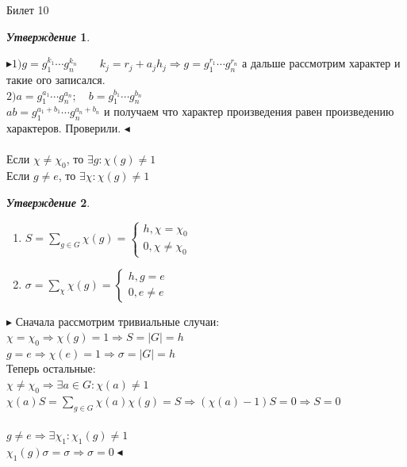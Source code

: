 \documentclass[a4paper,12pt]{article}
\newtheorem{utv}{\textit{Утверждение}}
\newcommand{\q}{\quad}
\newcommand{\pb}{\blacktriangleright}
\newcommand{\pe}{\blacktriangleleft}
\newcommand{\Ra}{\Rightarrow}
\newcommand{\SL}{\sum\limits}
\begin{document}
\begin{mybox}{\hypertarget{bil10}{Билет 10}}
\begin{utv}
\end{utv}
$\pb 1) g = g_1^{k_1}\cdots g_n^{k_n}\q\q k_j = r_j + a_jh_j\Ra g = g_1^{r_1}\cdots g_n^{r_n} $ а дальше рассмотрим характер и такие ого записался.\\
$2) a = g_1^{a_1}\cdots g_n^{a_n};\q b = g_1^{b_1}\cdots g_n^{b_n}$\\
$ab = g_1^{a_1 + b_1}\cdots g_n^{a_n + b_n}$ и получаем что характер произведения равен произведению характеров. Проверили. $\pe$\\\q\\
Если $\chi \not=\chi_0$, то $\exists g: \chi(g) \not=1$\\
Если $g\not=e$, то $\exists \chi: \chi(g)\not=1$
\begin{utv}\q\\
\begin{enumerate}
\item $S = \SL_{g\in G}\chi(g) = \begin{cases}h, \chi = \chi_0\\ 0, \chi \not= \chi_0\end{cases}$
\item $\sigma = \SL_{\chi}\chi(g) = \begin{cases}h, g = e\\ 0, e \not= e\end{cases}$
\end{enumerate}
\end{utv}
$\pb$ Сначала рассмотрим тривиальные случаи:\\
$\chi = \chi_0\Ra\chi(g) = 1\Ra S = |G| = h$\\
$g = e\Ra \chi(e) = 1\Ra\sigma = |G| = h$\\
Теперь остальные:\\
$\chi \not=\chi_0 \Ra \exists a\in G: \chi(a)\not=1$\\
$\chi(a)S = \SL_{g\in G}\chi(a)\chi(g) = S\Ra (\chi(a) - 1) S = 0 \Ra S = 0$\\\q\\
$g\not=e\Ra\exists \chi_1:\chi_1(g)\not=1$\\
$\chi_1(g)\sigma = \sigma \Ra \sigma = 0 \pe$


\end{mybox}
\end{document}
